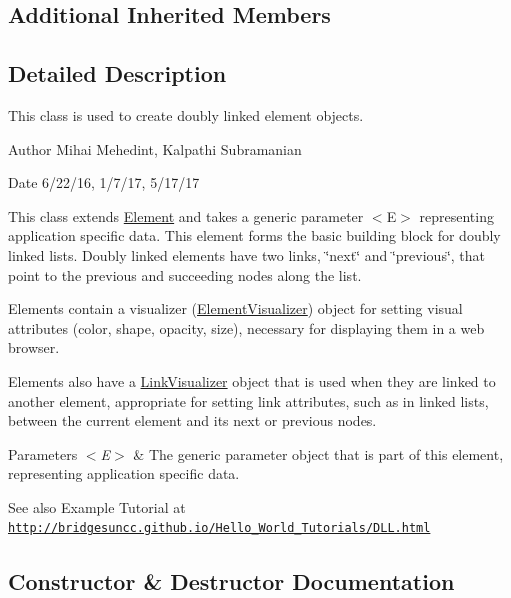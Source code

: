 \subsection*{Additional Inherited Members}


\subsection{Detailed Description}
This class is used to create doubly linked element objects. 

\begin{DoxyAuthor}{Author}
Mihai Mehedint, Kalpathi Subramanian
\end{DoxyAuthor}
\begin{DoxyDate}{Date}
6/22/16, 1/7/17, 5/17/17
\end{DoxyDate}
This class extends \hyperlink{classbridges_1_1base_1_1_element}{Element} and takes a generic parameter $<$\+E$>$ representing application specific data. This element forms the basic building block for doubly linked lists. Doubly linked elements have two links, \char`\"{}next\char`\"{} and \char`\"{}previous\char`\"{}, that point to the previous and succeeding nodes along the list.

Elements contain a visualizer (\hyperlink{classbridges_1_1base_1_1_element_visualizer}{Element\+Visualizer}) object for setting visual attributes (color, shape, opacity, size), necessary for displaying them in a web browser.

Elements also have a \hyperlink{classbridges_1_1base_1_1_link_visualizer}{Link\+Visualizer} object that is used when they are linked to another element, appropriate for setting link attributes, such as in linked lists, between the current element and its next or previous nodes.


\begin{DoxyParams}{Parameters}
{\em $<$\+E$>$} & The generic parameter object that is part of this element, representing application specific data.\\
\hline
\end{DoxyParams}
\begin{DoxySeeAlso}{See also}
Example Tutorial at ~\newline
 \href{http://bridgesuncc.github.io/Hello_World_Tutorials/DLL.html}{\tt http\+://bridgesuncc.\+github.\+io/\+Hello\+\_\+\+World\+\_\+\+Tutorials/\+D\+L\+L.\+html} 
\end{DoxySeeAlso}


\subsection{Constructor \& Destructor Documentation}
\hypertarget{classbridges_1_1base_1_1_d_lelement_a525b572340e161d9c430baff10b64ab2}{}
